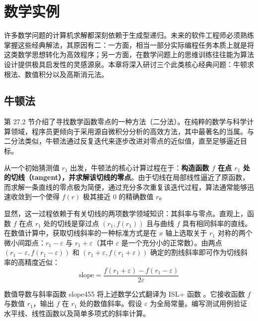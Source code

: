 
\chapter{数学实例}
\label{sec:ch28_math}

许多数学问题的计算机求解都深刻依赖于生成型递归。未来的软件工程师必须熟练掌握这些经典解法，其原因有二：一方面，相当一部分实际编程任务本质上就是将这类数学思想转化为高效程序；另一方面，在数学问题上的思维训练往往能为算法设计提供极具启发性的灵感源泉。本章将深入研讨三个此类核心经典问题：牛顿求根法、数值积分以及高斯消元法。

\section{牛顿法}
\label{sec:28_1}

第 27.2 节介绍了寻找数学函数零点的一种方法（二分法）。在纯粹的数学与科学计算领域，程序员更倾向于采用源自微积分分析的高效方法，其中最著名的当属。与二分法类似，牛顿法通过反复迭代来逐步改进对零点的近似值，直至足够逼近目标。

从一个初始猜测值 $r_1$ 出发，牛顿法的核心计算过程在于：\textbf{构造函数 $f$ 在点 $r_1$ 处的切线（tangent），并求解该切线的零点}。由于切线在局部线性逼近了原函数，而求解一条直线的零点极为简便，通过充分多次重复该迭代过程，算法通常能够迅速收敛到一个使得 $f(r)$ 极其接近 0 的精确数值 $r$。

显然，这一过程依赖于有关切线的两项数学领域知识：其斜率与零点。直观上，函数 $f$ 在点 $r_1$ 处的切线是穿过点 $(r_1, f(r_1))$ 且与曲线 $f$ 具有相同斜率的直线。在数值计算中，获取切线斜率的一种标准方式是在 $x$ 轴上选取关于 $r_1$ 对称的两个微小间距点：$r_1 - \varepsilon$ 与 $r_1 + \varepsilon$（其中 $\varepsilon$ 是一个充分小的正常数）。由两点 $(r_1 - \varepsilon, f(r_1 - \varepsilon))$ 和 $(r_1 + \varepsilon, f(r_1 + \varepsilon))$ 确定的割线斜率即可作为切线斜率的高精度近似：
\[ \text{slope} = \frac{f(r_1 + \varepsilon) - f(r_1 - \varepsilon)}{2\varepsilon} \]

\begin{exercise}{数值导数与斜率函数 slope}{455}\label{ex:455}
将上述数学公式翻译为 ISL+ 函数 。它接收函数 $f$ 与数值 $r_1$，输出 $f$ 在 $r_1$ 处的数值斜率。假设 $\varepsilon$ 为全局常量。编写测试用例验证水平线、线性函数以及简单多项式的斜率计算。
\end{exercise}

